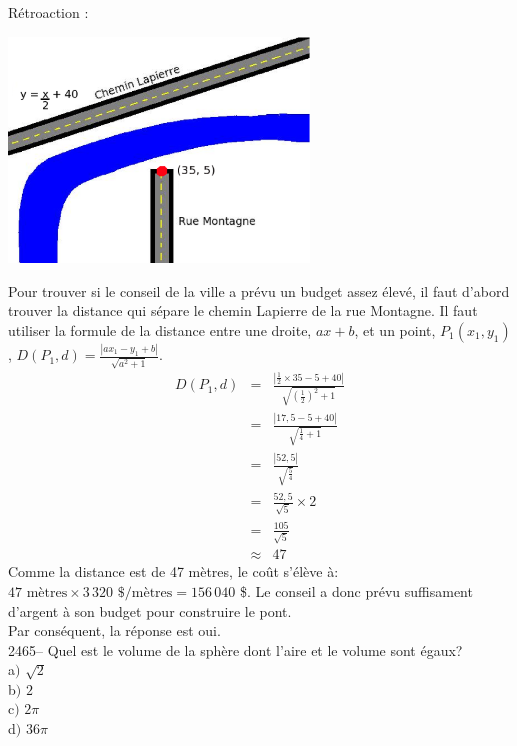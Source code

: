 \documentclass[letterpaper, 12pt]{article}
\begin{document}
R\'etroaction :\\
\begin{center}
 \includegraphics[width=8cm,bb=14 14 553 418]{Q2464.eps}
\end{center}
Pour trouver si le conseil de la ville a pr\'evu un budget assez \'elev\'e, il faut d'abord trouver la distance qui s\'epare le chemin Lapierre de la rue Montagne. Il faut utiliser la formule de la distance entre une droite, $ax+b$, et un point, $P_{1}(x_{1}, y_{1})$, $D(P_{1}, d)=\frac{|ax_{1}-y_{1}+b|}{\sqrt{a^{2}+1}}$.
\begin{eqnarray*}
 D(P_{1}, d)&=&\frac{|\frac{1}{2}\times 35-5+40|}{\sqrt{(\frac{1}{2})^{2}+1}}\\[2mm]
&=&\frac{|17,5-5+40|}{\sqrt{\frac{1}{4}+1}}\\[2mm]
&=&\frac{|52,5|}{\sqrt{\frac{5}{4}}}\\[2mm]
&=&\frac{52,5}{\sqrt{5}}\times 2\\[2mm]
&=&\frac{105}{\sqrt{5}}\\[2mm]
&\approx&47
\end{eqnarray*}
Comme la distance est de 47 m\`etres, le co\^ut s'\'el\`eve \`a: $47\textrm{ m\`etres}  \times 3\,320\textrm{ \$/m\`etres}  = 156\,040$ \$. Le conseil a donc pr\'evu suffisament d'argent \`a son budget pour construire le pont.\\
Par cons\'equent, la r\'eponse est oui.\\

2465-- Quel est le volume de la sph\`ere dont l'aire et le volume sont \'egaux?\\

a$)$ $\sqrt{2}$\\
b$)$ $2$\\
c$)$ $2\pi$\\
d$)$ $36\pi$\\
\end{document}
